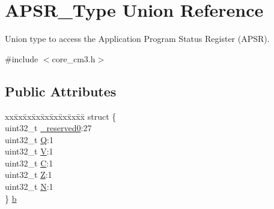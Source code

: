 \hypertarget{union_a_p_s_r___type}{\section{A\-P\-S\-R\-\_\-\-Type Union Reference}
\label{union_a_p_s_r___type}
}


Union type to access the Application Program Status Register (A\-P\-S\-R).  




{\ttfamily \#include $<$core\-\_\-cm3.\-h$>$}

\subsection*{Public Attributes}
\begin{DoxyCompactItemize}
\item 
\begin{tabbing}
xx\=xx\=xx\=xx\=xx\=xx\=xx\=xx\=xx\=\kill
struct \{\\
\>uint32\_t \hyperlink{union_a_p_s_r___type_afbce95646fd514c10aa85ec0a33db728}{\_reserved0}:27\\
\>uint32\_t \hyperlink{union_a_p_s_r___type_a22d10913489d24ab08bd83457daa88de}{Q}:1\\
\>uint32\_t \hyperlink{union_a_p_s_r___type_a8004d224aacb78ca37774c35f9156e7e}{V}:1\\
\>uint32\_t \hyperlink{union_a_p_s_r___type_a86e2c5b891ecef1ab55b1edac0da79a6}{C}:1\\
\>uint32\_t \hyperlink{union_a_p_s_r___type_a3b04d58738b66a28ff13f23d8b0ba7e5}{Z}:1\\
\>uint32\_t \hyperlink{union_a_p_s_r___type_a7e7bbba9b00b0bb3283dc07f1abe37e0}{N}:1\\
\} \hyperlink{union_a_p_s_r___type_a4de9553e1a179b9f95ed77b23e177951}{b}\\


\end{tabbing}
\end{DoxyCompactItemize}

